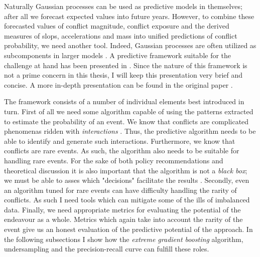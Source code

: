 \documentclass[a4paper]{article}
\begin{document}

Naturally Gaussian processes can be used as predictive models in themselves; after all we forecast expected values into future years. However, to combine these forecasted values of conflict magnitude, conflict exposure and the derived measures of slops, accelerations and mass into unified predictions of conflict probability, we need another tool. Indeed, Gaussian processes are often utilized as subcomponents in larger models \citep[505]{Gelman_2013}. A predictive framework suitable for the challenge at hand has been presented in \cite{Maase}. Since the nature of this framework is not a prime concern in this thesis, I will keep this presentation very brief and concise. A more in-depth presentation can be found in the original paper \citep[9-12]{Maase}.\par %

The framework consists of a number of individual elements best introduced in turn. First of all we need some algorithm capable of using the patterns extracted to estimate the probability of an event. We know that conflicts are complicated phenomenas ridden with \emph{interactions} \citep[474]{cederman2017predicting}. Thus, the predictive algorithm needs to be able to identify and generate such interactions. Furthermore, we know that conflicts are rare events. As such, the algorithm also needs to be suitable for handling rare events. For the sake of both policy recommendations and theoretical discussion it is also important that the algorithm is not a \emph{black box}; we must be able to asses which "decisions" facilitate the results \cite[476]{cederman2017predicting}. Secondly, even an algorithm tuned for rare events can have difficulty handling the rarity of conflicts. As such I need tools which can mitigate some of the ills of imbalanced data. Finally, we need appropriate metrics for evaluating the potential of the endeavour as a whole. Metrics which again take into account the rarity of the event give us an honest evaluation of the predictive potential of the approach. In the following subsections I show how the \emph{extreme gradient boosting} algorithm, undersampling and the precision-recall curve can fulfill these roles.\par

\end{document}
